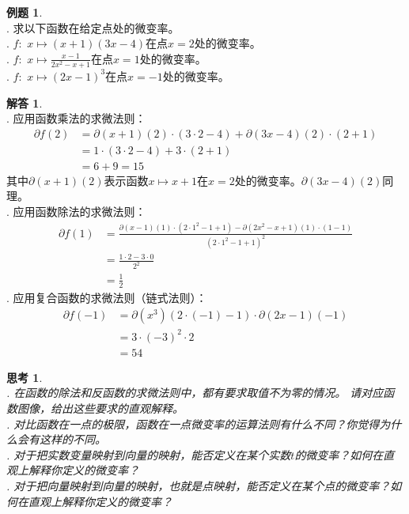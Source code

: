 \documentclass[12pt,UTF8]{ctexbook}
\theoremstyle{definition}
\newtheorem{et}{例题}[section]
\newtheorem*{so}{解答}
\theoremstyle{plain}
\newtheorem{sk}{思考}[section]
\begin{document}
\begin{et}
    \mbox{} \\
    . 求以下函数在给定点处的微变率。\\
    . $f: \,\, x \mapsto (x + 1)(3x -4)$在点$x = 2$处的微变率。\\
    . $f: \,\, x \mapsto \frac{x - 1}{2x^2 - x + 1}$在点$x = 1$处的微变率。\\
    . $f: \,\, x \mapsto (2x - 1)^3$在点$x = -1$处的微变率。\\
\end{et}

\begin{so}
    \mbox{} \\
    . 应用函数乘法的求微法则：
    \begin{align*}
        \partial f(2) &= \partial (x + 1) (2) \cdot (3 \cdot 2 - 4) + \partial (3x - 4) (2) \cdot (2 + 1)  \\
        &= 1 \cdot (3 \cdot 2 - 4) + 3 \cdot (2 + 1)  \\
        &= 6 + 9 = 15   
    \end{align*}
    其中$\partial (x + 1) (2)$表示函数$x\mapsto x + 1$在$x = 2$处的微变率。$\partial (3x - 4) (2)$同理。\\
    . 应用函数除法的求微法则：
    \begin{align*}
        \partial f(1) &= \frac{\partial (x - 1) (1) \cdot (2 \cdot 1^2 - 1 + 1) - \partial (2x^2 - x + 1) (1) \cdot (1 - 1)}{(2\cdot 1^2 - 1 + 1)^2}  \\
        &= \frac{ 1 \cdot 2 - 3 \cdot 0}{2^2}  \\
        &= \frac{1}{2}   
    \end{align*}
    . 应用复合函数的求微法则（链式法则）：
    \begin{align*}
        \partial f(-1) &= \partial (x^3) (2\cdot (-1) - 1) \cdot \partial (2x - 1) (-1)  \\
        &= 3\cdot (-3)^2 \cdot 2  \\
        &= 54   
    \end{align*}

\end{so}

\begin{sk}
    \mbox{} \\
    . 在函数的除法和反函数的求微法则中，都有要求取值不为零的情况。
    请对应函数图像，给出这些要求的直观解释。\\
    . 对比函数在一点的极限，函数在一点微变率的运算法则有什么不同？你觉得为什么会有这样的不同。\\
    . 对于把实数变量映射到向量的映射，能否定义在某个实数$t$的微变率？如何在直观上解释你定义的微变率？\\
    . 对于把向量映射到向量的映射，也就是点映射，能否定义在某个点的微变率？如何在直观上解释你定义的微变率？
    
\end{sk}
\end{document}
